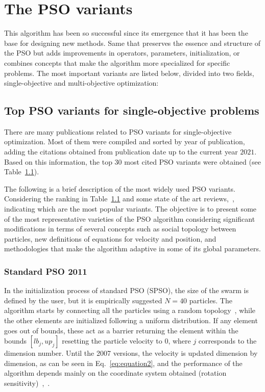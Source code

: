 \section{The PSO variants}
\label{sec:variants}

This algorithm has been so successful since its emergence that it has been the base for designing new methods. Same that preserves the essence and structure of the PSO but adds improvements in operators, parameters, initialization, or combines concepts that make the algorithm more specialized for specific problems. The most important variants are listed below, divided into two fields, single-objective and multi-objective optimization:\\ 

\subsection{Top PSO variants for single-objective problems}
\label{tab:pso_variants}
There are many publications related to PSO variants for single-objective optimization. Most of them were compiled and sorted by year of publication, adding the citations obtained from publication date up to the current year $2021$. Based on this information, the top 30 most cited PSO variants were obtained (see Table~\ref{tab:pso_variants}).




The following is a brief description of the most widely used PSO variants. Considering the ranking in Table~\ref{tab:pso_variants} and some state of the art reviews,~\cite{garcia2012brief},~\cite{sousa2017review}~\cite{sedighizadeh2009particle}~\cite{kameyama2009particle} indicating which are the most popular variants. The objective is to present some of the most representative varieties of the PSO algorithm considering significant modifications in terms of several concepts such as social topology between particles, new definitions of equations for velocity and position, and methodologies that make the algorithm adaptive in some of its global parameters.  

\subsubsection{Standard PSO 2011}

In the initialization process of standard PSO (SPSO), the size of the swarm is defined by the user, but it is empirically suggested $N=40$ particles. The algorithm starts by connecting all the particles using a random topology~\cite{clerc2010particle}, while the other elements are initialized following a uniform distribution. If any element goes out of bounds, these act as a barrier returning the element within the bounds $[lb_j, up_j]$ resetting the particle velocity to $0$, where $j$ corresponds to the dimension number.
Until the 2007 versions, the velocity is updated dimension by dimension, as can be seen in Eq.~\eqref{eq:equation2}, and the performance of the algorithm depends mainly on the coordinate system obtained (rotation sensitivity)~\cite{clerc2012beyond},~\cite{spears2012biases}.


